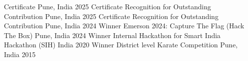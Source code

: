 


\begin{cvhonors}

  \cvhonor
    {Certificate} %
    {} %
    {Pune, India} %
    {2025} %
  \cvhonor
    {Certificate} %
    {Recognition for Outstanding Contribution} %
    {Pune, India} %
    {2025} %
  \cvhonor
    {Certificate} %
    {Recognition for Outstanding Contribution} %
    {Pune, India} %
    {2024} %
  \cvhonor
    {Winner} %
    {Emerson 2024: Capture The Flag (Hack The Box)} %
    {Pune, India} %
    {2024} %
  \cvhonor
    {Winner} %
    {Internal Hackathon for Smart India Hackathon (SIH)} %
    {India} %
    {2020} %
  \cvhonor
    {Winner} %
    {District level Karate Competition} %
    {Pune, India} %
    {2015} %
\end{cvhonors}